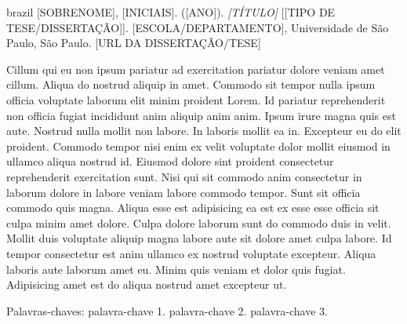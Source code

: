 
\begin{resumo}[RESUMO]
  \begin{otherlanguage*}{brazil}
{[}SOBRENOME{]}, {[}INICIAIS{]}. ({[}ANO{]}). \emph{{[}TÍTULO{]}}
{[}{[}TIPO DE TESE/DISSERTAÇÃO{]}{]}. {[}ESCOLA/DEPARTAMENTO{]},
Universidade de São Paulo, São Paulo. {[}URL DA DISSERTAÇÃO/TESE{]}

Cillum qui eu non ipsum pariatur ad exercitation pariatur dolore veniam
amet cillum. Aliqua do nostrud aliquip in amet. Commodo sit tempor nulla
ipsum officia voluptate laborum elit minim proident Lorem. Id pariatur
reprehenderit non officia fugiat incididunt anim aliquip anim anim.
Ipsum irure magna quis est aute. Nostrud nulla mollit non labore. In
laboris mollit ea in. Excepteur eu do elit proident. Commodo tempor nisi
enim ex velit voluptate dolor mollit eiusmod in ullamco aliqua nostrud
id. Eiusmod dolore sint proident consectetur reprehenderit exercitation
sunt. Nisi qui sit commodo anim consectetur in laborum dolore in labore
veniam labore commodo tempor. Sunt sit officia commodo quis magna.
Aliqua esse est adipisicing ea est ex esse esse officia sit culpa minim
amet dolore. Culpa dolore laborum sunt do commodo duis in velit. Mollit
duis voluptate aliquip magna labore aute sit dolore amet culpa labore.
Id tempor consectetur est anim ullamco ex nostrud voluptate excepteur.
Aliqua laboris aute laborum amet eu. Minim quis veniam et dolor quis
fugiat. Adipisicing amet est do aliqua nostrud amet excepteur ut.

Palavras-chaves: palavra-chave 1. palavra-chave 2. palavra-chave 3.
  \end{otherlanguage*}
\end{resumo}


\renewcommand{\listfigurename}{LIST OF FIGURES}
\pdfbookmark[0]{\listfigurename}{lof}
\listoffigures*
\cleardoublepage


